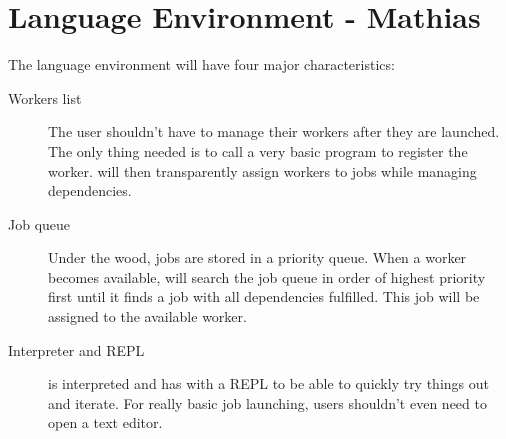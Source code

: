\section{Language Environment - Mathias}
\label{sect:tech}
The language environment will have four major characteristics:
\begin{description}
\item[Workers list] The user shouldn't have to manage their workers after
they are launched. The only thing needed is to call a very basic program
to register the worker. \lang will then transparently assign workers
to jobs while managing dependencies.
\item[Job queue] Under the wood, jobs are stored in a priority queue. When a
worker becomes available, \lang will search the job queue in order of highest
priority first until it finds a job with all dependencies fulfilled. This job
will be assigned to the available worker.
\item[Interpreter and REPL] \lang is interpreted and has with a REPL to be able to
quickly try things out and iterate. For really basic job launching, users shouldn't
even need to open a text editor.
\end{description}

